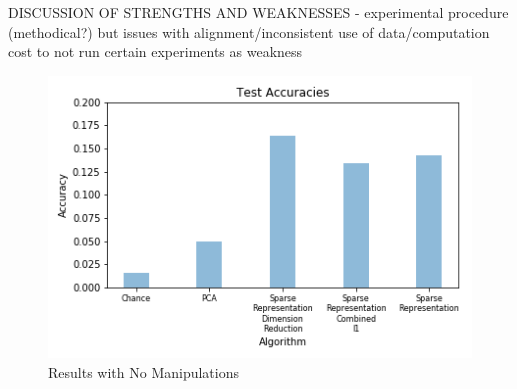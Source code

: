 \documentclass[pageno]{cos429}
\begin{document}
DISCUSSION OF STRENGTHS AND WEAKNESSES - experimental procedure (methodical?) but issues with alignment/inconsistent use of data/computation cost to not run certain experiments as weakness

\begin{figure}
\centering
\includegraphics[scale=0.5]{../figures/results_plots/default.png}
\caption{Results with No Manipulations}
\label{fig:results_default}
\end{figure}
\end{document}
